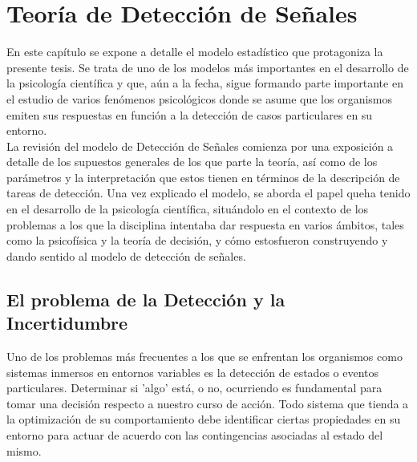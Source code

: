
\chapter{Teoría de Detección de Señales} %

\label{Cap_SDT} %


\newcommand{\keyword}[1]{\textbf{#1}}
\newcommand{\tabhead}[1]{\textbf{#1}}
\newcommand{\code}[1]{\texttt{#1}}
\newcommand{\file}[1]{\texttt{\bfseries#1}}
\newcommand{\option}[1]{\texttt{\itshape#1}}


En este capítulo se expone a detalle el modelo estadístico que protagoniza la presente tesis. Se trata de uno de los modelos más importantes en el desarrollo de la psicología científica y que, aún a la fecha, sigue formando parte importante en el estudio de varios fenómenos psicológicos donde se asume que los organismos emiten sus respuestas en función a la detección de casos particulares en su entorno.\\

La revisión del modelo de Detección de Señales comienza por una exposición a detalle de los supuestos generales de los que parte la teoría, así como de los parámetros y la interpretación que estos tienen en términos de la descripción de tareas de detección. Una vez explicado el modelo, se aborda el papel queha tenido en el desarrollo de la psicología científica, situándolo en el contexto de los problemas a los que la disciplina intentaba dar respuesta en varios ámbitos, tales como la psicofísica y la teoría de decisión, y cómo estosfueron construyendo y dando sentido al modelo de detección de señales.

\section{El problema de la Detección y la Incertidumbre}

Uno de los problemas más frecuentes a los que se enfrentan los organismos como sistemas inmersos en entornos variables es la detección de estados o eventos particulares. Determinar si 'algo' está, o no, ocurriendo es fundamental para tomar una decisión respecto a nuestro curso de acción. Todo sistema que tienda a la optimización de su comportamiento debe identificar ciertas propiedades en su entorno para actuar de acuerdo con las contingencias asociadas al estado del mismo.\\

